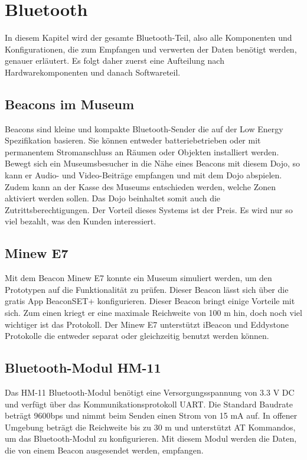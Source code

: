 \chapter{Bluetooth}
\label{Bluetooth}
\thispagestyle{fancy} 
In diesem Kapitel wird der gesamte Bluetooth-Teil, also alle Komponenten und Konfigurationen, die zum Empfangen und verwerten der Daten benötigt werden, genauer erläutert. Es folgt daher zuerst eine Aufteilung nach Hardwarekomponenten und danach Softwareteil. 

\section{Beacons im Museum}
Beacons sind kleine und kompakte Bluetooth-Sender die auf der Low Energy Spezifikation basieren. Sie können entweder batteriebetrieben oder mit permanentem Stromanschluss an Räumen oder Objekten installiert werden\cite{TechTag}. Bewegt sich ein Museumsbesucher in die Nähe eines Beacons mit diesem Dojo, so kann er Audio- und Video-Beiträge empfangen und mit dem Dojo abspielen. Zudem kann an der Kasse des Museums entschieden werden, welche Zonen aktiviert werden sollen. Das Dojo beinhaltet somit auch die Zutrittsberechtigungen. Der Vorteil dieses Systems ist der Preis. Es wird nur so viel bezahlt, was den Kunden  interessiert.	

\section{Minew E7}
Mit dem Beacon Minew E7 konnte ein Museum simuliert werden, um den Prototypen auf die Funktionalität zu prüfen. Dieser Beacon lässt sich über die gratis App BeaconSET+  konfigurieren. Dieser Beacon bringt einige Vorteile mit sich. Zum einen kriegt er eine maximale Reichweite von 100 m  hin, doch noch viel wichtiger ist das Protokoll. Der Minew E7 unterstützt iBeacon und Eddystone Protokolle die entweder separat oder gleichzeitig benutzt werden können. \cite{beaconshop24}

\section{Bluetooth-Modul HM-11}
Das HM-11 Bluetooth-Modul benötigt eine Versorgungsspannung von 3.3 V DC und verfügt über das Kommunikationsprotokoll UART. Die Standard Baudrate beträgt 9600bps und nimmt beim Senden einen Strom von 15 mA auf. In offener Umgebung beträgt die Reichweite bis zu 30 m und unterstützt AT Kommandos, um das Bluetooth-Modul zu konfigurieren. Mit diesem Modul werden die Daten, die von einem Beacon ausgesendet werden, empfangen.  

